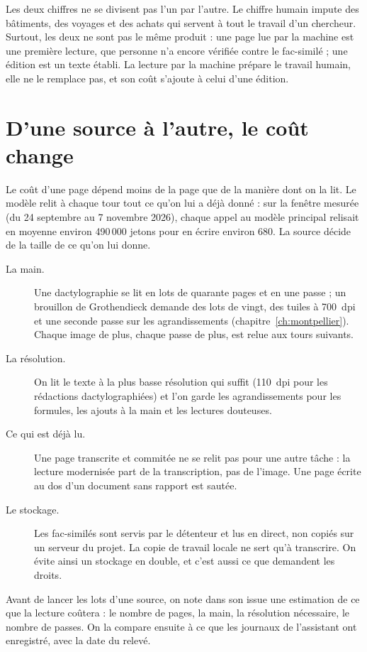 Les deux chiffres ne se divisent pas l'un par l'autre. Le chiffre humain impute des
bâtiments, des voyages et des achats qui servent à tout le travail d'un chercheur. Surtout,
les deux ne sont pas le même produit : une page lue par la machine est une première
lecture, que personne n'a encore vérifiée contre le fac-similé ; une édition est un texte
établi. La lecture par la machine prépare le travail humain, elle ne le remplace pas, et
son coût s'ajoute à celui d'une édition.

\section{D'une source à l'autre, le coût change}

Le coût d'une page dépend moins de la page que de la manière dont on la lit. Le modèle
relit à chaque tour tout ce qu'on lui a déjà donné : sur la fenêtre mesurée (du 24 septembre
au 7 novembre 2026), chaque appel au modèle principal relisait en moyenne environ 490\,000
jetons pour en écrire environ 680. La source décide de la taille de ce qu'on lui donne.

\begin{description}
  \item[La main.] Une dactylographie se lit en lots de quarante pages et en une passe ; un
        brouillon de Grothendieck demande des lots de vingt, des tuiles à 700~dpi et une
        seconde passe sur les agrandissements (chapitre~\ref{ch:montpellier}). Chaque image
        de plus, chaque passe de plus, est relue aux tours suivants.
  \item[La résolution.] On lit le texte à la plus basse résolution qui suffit (110~dpi
        pour les rédactions dactylographiées) et l'on garde les agrandissements pour les
        formules, les ajouts à la main et les lectures douteuses.
  \item[Ce qui est déjà lu.] Une page transcrite et commitée ne se relit pas pour une autre
        tâche : la lecture modernisée part de la transcription, pas de l'image. Une page
        écrite au dos d'un document sans rapport est sautée.
  \item[Le stockage.] Les fac-similés sont servis par le détenteur et lus en direct, non
        copiés sur un serveur du projet. La copie de travail locale ne sert qu'à
        transcrire. On évite ainsi un stockage en double, et c'est aussi ce que demandent
        les droits.
\end{description}

\begin{regle}
Avant de lancer les lots d'une source, on note dans son issue une estimation de ce que la
lecture coûtera : le nombre de pages, la main, la résolution nécessaire, le nombre de
passes. On la compare ensuite à ce que les journaux de l'assistant ont enregistré, avec la
date du relevé.
\end{regle}

